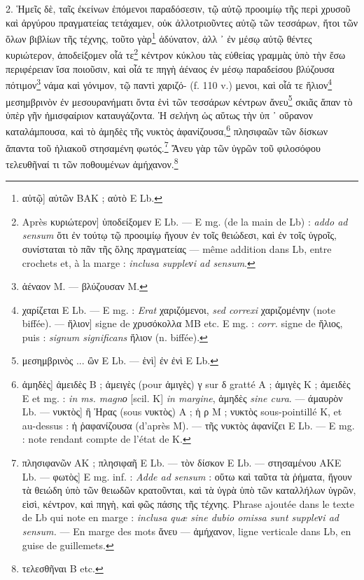 \documentclass[a4paper, 11pt, oneside, polutonikogreek, french]{article}
\begin{document}
2. Ἡμεῖς δὲ, ταῖς ἐκείνων ἑπόμενοι παραδόσεσιν, τῷ αὐτῷ προοιμίῳ τῆς περὶ χρυσοῦ καὶ ἀργύρου πραγματείας τετάχαμεν, οὐκ ἀλλοτριοῦντες αὐτῷ τῶν τεσσάρων, ἤτοι τῶν ὅλων βιβλίων τῆς τέχνης, τοῦτο γὰρ\footnote{αὐτῷ] αὐτῶν BAK ; αὐτὸ E Lb.} ἀδύνατον, ἀλλ ᾽ ἐν μέσῳ αὐτῷ θέντες κυριώτερον, ἀποδείξομεν οἷά τε\footnote{Après κυριώτερον] ὑποδείξομεν E Lb. --- E mg. (de la main de Lb) : \emph{addo ad sensum} ὅτι ἐν τούτῳ τῷ προοιμίῳ ἤγουν ἐν τοῖς θειώδεσι, καὶ ἐν τοῖς ὑγροῖς, συνίσταται τὸ πᾶν τῆς ὅλης πραγματείας --- même addition dans Lb, entre crochets et, à la marge : \emph{inclusa suppleνi ad sensum}.} κέντρον κύκλου τὰς εὐθείας γραμμὰς ὑπὸ τὴν ἔσω περιφέρειαν ἴσα ποιοῦσιν, καὶ οἶά τε πηγὴ ἀέναος ἐν μέσῳ παραδείσου βλύζουσα πότιμον\footnote{ἀέναον M. --- βλύζουσαν M.} νάμα καὶ γόνιμον, τῷ παντὶ χαριζό- (f. 110 v.) μενοι, καὶ οἷά τε ἥλιον\footnote{χαρίζεται E Lb. --- E mg. : \emph{Erat} χαριζόμενοι, \emph{sed correxi} χαριζομένην (note biffée). --- ἥλιον] signe de χρυσόκολλα MB etc. E mg. : \emph{corr.} signe de ἥλιος, puis : \emph{signum significans} ἥλιον (n. biffée).} μεσημβρινὸν ἐν μεσουρανήματι ὄντα ἑνὶ τῶν τεσσάρων κέντρων ἄνευ\footnote{μεσημβρινὸς ... ὢν E Lb. --- ἑνὶ] ἐν ἐνὶ E Lb.} σκιᾶς ἅπαν τὸ ὑπὲρ γῆν ἡμισφαίριον καταυγάζοντα. Ἡ σελήνη ὡς αὕτως τὴν ὑπ ᾽ οὔρανον καταλάμπουσα, καὶ τὸ ἀμηδὲς τῆς νυκτὸς ἀφανίζουσα,\footnote{ἀμηδὲς] ἀμειδὲς B ; ἀμειγὲς (pour ἀμιγὲς) γ sur δ gratté A ; ἀμιγὲς K ; ἀμειδὲς E et mg. : \emph{in ms. magnο} [scil. K] \emph{in margine}, ἀμηδὲς \emph{sine cura}. --- άμαυρὸν Lb. --- νυκτὸς] ἢ Ἡρας (sous νυκτὸς) A ; ἡ ρ M ; νυκτὸς sous-pointillé Κ, et au-dessus : ἡ ῥαφανίζουσα (d'après M). --- τῆς νυκτὸς ἀφανίζει E Lb. --- E mg. : note rendant compte de l'état de K.} πλησιφαῶν τῶν δίσκων ἅπαντα τοῦ ἡλιακοῦ στησαμένη φωτός.\footnote{πλησιφανῶν AK ; πλησιφαῆ E Lb. --- τὸν δίσκον E Lb. --- στησαμένου AKE Lb. --- φωτὸς] E mg. inf. : \emph{Adde ad sensum} : οὕτω καὶ ταῦτα τὰ ῥήματα, ἤγουν τὰ θειώδη ὑπὸ τῶν θειωδῶν κρατοῦνται, καὶ τὰ ὑγρὰ ὑπὸ τῶν καταλλήλων ὑγρῶν, εὶσὶ, κέντρον, καὶ πηγὴ, καὶ φῶς πάσης τῆς τέχνης. Phrase ajoutée dans le texte de Lb qui note en marge : \emph{inclusa quæ sine dubio omissa sunt suppleνi ad sensum.} --- En marge des mots ἄνευ --- ἀμήχανον, ligne verticale dans Lb, en guise de guillemets.} Ἄνευ γὰρ τῶν ὑγρῶν τοῦ φιλοσόφου τελευθῆναί τι τῶν ποθουμένων ἀμήχανον.\footnote{τελεσθῆναι B etc.}
\end{document}
